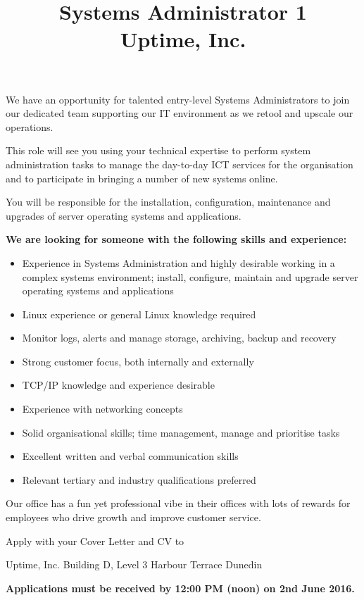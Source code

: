 \documentclass{article}   	%
\title{Systems Administrator 1\\Uptime, Inc.}
\begin{document}
\maketitle
We have an opportunity for talented entry-level Systems Administrators to join our dedicated team supporting our IT environment as we retool and upscale our operations.
 
This role will see you using your technical expertise to perform system administration tasks to manage the day-to-day ICT services for the organisation and to participate in bringing a number of new systems online.
 
You will be responsible for the installation, configuration, maintenance and upgrades of server operating systems and applications.
 

\textbf{We are looking for someone with the following skills and experience:}
\begin{itemize}
\item Experience in Systems Administration and highly desirable working in a complex systems environment; install, configure, maintain and upgrade server operating systems and applications
\item Linux experience or general Linux knowledge required
\item Monitor logs, alerts and manage storage, archiving, backup and recovery
\item Strong customer focus, both internally and externally  
\item TCP/IP knowledge and experience desirable
\item Experience with networking concepts
\item Solid organisational skills; time management, manage and prioritise tasks
\item Excellent written and verbal communication skills
\item Relevant tertiary and industry qualifications preferred
\end{itemize}

Our office has a fun yet professional vibe in their offices with lots of rewards for employees who drive growth and improve customer service.
 
Apply with your Cover Letter and CV to


Uptime, Inc.
Building D, Level 3
Harbour Terrace
Dunedin

\textbf{Applications must be received by 12:00 PM (noon) on 2nd June 2016.}
\end{document}
